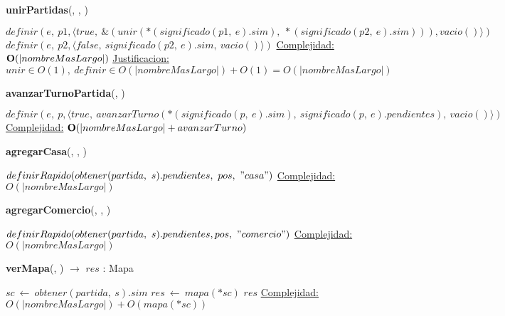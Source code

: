 \begin{Algoritmos}
    \begin{algorithm}[H]{\textbf{unirPartidas}(, , )}
        \begin{algorithmic}[1]
            \State $definir(e,\ p1, \langle true,\ \&(unir(*(significado(p1,\ e).sim),\ *(significado(p2,\ e).sim))), vacio()\rangle)$
            \State $definir(e,\ p2, \langle false,\ significado(p2,\ e).sim,\ vacio() \rangle)$
            \medskip
            \Statex \underline{Complejidad:} $\bold{O}(|nombreMasLargo|)$
            \Statex \underline{Justificacion:} $unir \in O(1),\ definir \in O(|nombreMasLargo|) + O(1) = O(|nombreMasLargo|)$
        \end{algorithmic}
    \end{algorithm}   
    
    \begin{algorithm}[H]{\textbf{avanzarTurnoPartida}(, )}
        \begin{algorithmic}[1]
            \State $definir(e,\ p, \langle true,\ avanzarTurno(*(significado(p,\ e).sim),\ significado(p,\ e).pendientes),\ vacio()\rangle)$
            \medskip
            \Statex \underline{Complejidad:} $\bold{O}(|nombreMasLargo| + avanzarTurno)$
        \end{algorithmic}
    \end{algorithm}   

    \begin{algorithm}[H]{\textbf{agregarCasa}(, , )} %
    \begin{algorithmic}[1]
        \State $definirRapido(obtener(partida,\ s).pendientes,\ pos,\ "casa")$
        \medskip
        \Statex \underline{Complejidad:} $O(|nombreMasLargo|)$
    \end{algorithmic}
    \end{algorithm}
    
    \begin{algorithm}[H]{\textbf{agregarComercio}(, , )} %
    \begin{algorithmic}[1]
        \State $definirRapido(obtener(partida,\ s).pendientes, pos,\ "comercio")$ 
        \medskip
        \Statex \underline{Complejidad:} $O(|nombreMasLargo|)$
    \end{algorithmic}
    \end{algorithm}

    \begin{algorithm}[H]{\textbf{verMapa}(, ) $\to$ $res$ : Mapa}
    \begin{algorithmic}[1]
        \State $sc\ \leftarrow\ obtener(partida,\ s).sim$
        \State $res\ \leftarrow\ mapa(*sc)$ 
        \State \Return $res$
        \medskip
        \Statex \underline{Complejidad:} $O(|nombreMasLargo|) + O(mapa(*sc))$
    \end{algorithmic}
    \end{algorithm}
      

\end{Algoritmos}
